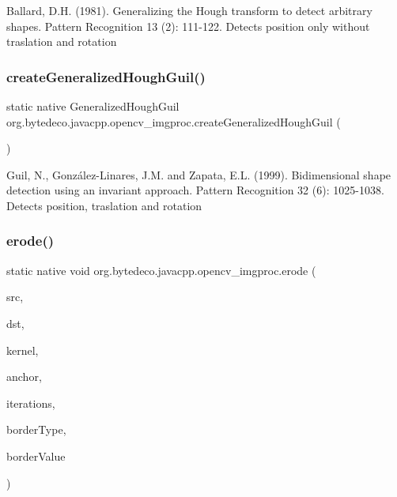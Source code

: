 Ballard, D.\+H. (1981). Generalizing the Hough transform to detect arbitrary shapes. Pattern Recognition 13 (2)\+: 111-\/122. Detects position only without traslation and rotation \mbox{\label{group__imgproc__filter_ga5b2d07c2bc26dfd8aa2daeae1b3adfac}} 
\subsubsection{\texorpdfstring{create\+Generalized\+Hough\+Guil()}{createGeneralizedHoughGuil()}}
{\footnotesize\ttfamily static native Generalized\+Hough\+Guil org.\+bytedeco.\+javacpp.\+opencv\+\_\+imgproc.\+create\+Generalized\+Hough\+Guil (\begin{DoxyParamCaption}{ }\end{DoxyParamCaption})\hspace{0.3cm}{\ttfamily [static]}}

Guil, N., González-\/\+Linares, J.\+M. and Zapata, E.\+L. (1999). Bidimensional shape detection using an invariant approach. Pattern Recognition 32 (6)\+: 1025-\/1038. Detects position, traslation and rotation \mbox{\label{group__imgproc__filter_ga8c0cbcc8dd271aada560698924d19cb2}} 
\subsubsection{\texorpdfstring{erode()}{erode()}}
{\footnotesize\ttfamily static native void org.\+bytedeco.\+javacpp.\+opencv\+\_\+imgproc.\+erode (\begin{DoxyParamCaption}\item[{@By\+Val Mat}]{src,  }\item[{@By\+Val Mat}]{dst,  }\item[{@By\+Val Mat}]{kernel,  }\item[{@By\+Val(null\+Value=\char`\"{}cv\+::\+Point(-\/1,-\/1)\char`\"{}) Point}]{anchor,  }\item[{int}]{iterations,  }\item[{int}]{border\+Type,  }\item[{@Const @By\+Ref(null\+Value=\char`\"{}cv\+::\+Scalar(cv\+::morphology\+Default\+Border\+Value())\char`\"{}) Scalar}]{border\+Value }\end{DoxyParamCaption})\hspace{0.3cm}{\ttfamily [static]}}



